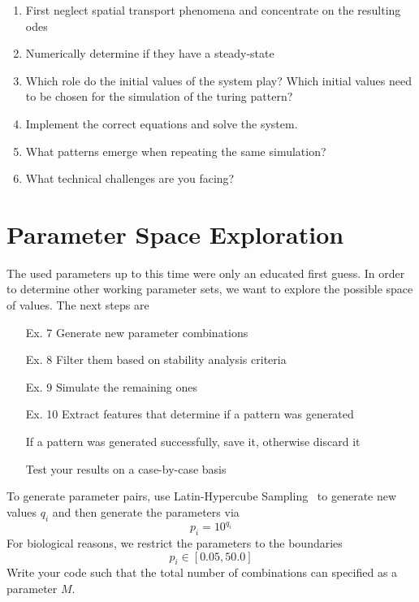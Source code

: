 \begin{enumerate}
    \item First neglect spatial transport phenomena and concentrate on the resulting \acp{ode}
    \item Numerically determine if they have a steady-state
    \item Which role do the initial values of the system play?
    Which initial values need to be chosen for the simulation of the turing pattern?
    \item Implement the correct equations and solve the system.
    \item What patterns emerge when repeating the same simulation?
    \item What technical challenges are you facing?
\end{enumerate}
%
%
\section{Parameter Space Exploration}
The used parameters up to this time were only an educated first guess.
In order to determine other working parameter sets, we want to explore the possible space of values.
The next steps are
\begin{enumerate}
    \item[Ex.  7] Generate new parameter combinations
    \item[Ex.  8] Filter them based on stability analysis criteria
    \item[Ex.  9] Simulate the remaining ones
    \item[Ex. 10] Extract features that determine if a pattern was generated
    \item[] If a pattern was generated successfully, save it, otherwise discard it
    \item[] Test your results on a case-by-case basis
\end{enumerate}
%
%
To generate parameter pairs, use Latin-Hypercube Sampling~\cite{McKay1979,wiki:Latin_hypercube_sampling} to generate new values $q_i$ and then generate the parameters via
\begin{equation}
    p_i = 10^{q_i}
\end{equation}
For biological reasons, we restrict the parameters to the boundaries
\begin{equation}
    p_i \in [0.05, 50.0]
\end{equation}
Write your code such that the total number of combinations can specified as a parameter $M$.
